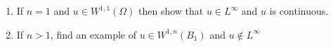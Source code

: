 \begin{enumerate}
\item
  If $n = 1$ and $u \in W^{1, 1}(\Omega)$ then show that $u \in L^\infty$ and $u$ is continuous.

\item
  If $n > 1$, find an example of $u \in W^{1, n}(B_1)$ and $u \notin L^\infty$

\end{enumerate}
